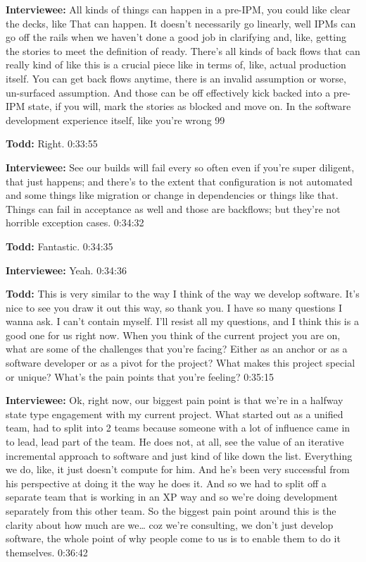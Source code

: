 \textbf{Interviewee:} 	All kinds of things can happen in a pre-IPM, you could like clear the decks, like   That can happen.  It doesn't necessarily go linearly, well IPMs can go off the rails when we haven't done a good job in clarifying and, like, getting the stories to meet the definition of ready.  There's all kinds of back flows that can really kind of like this is a crucial piece like in terms of, like, actual production itself.  You can get back flows anytime, there is an invalid assumption or worse, un-surfaced assumption. And those can be off effectively kick backed into a pre-IPM state, if you will, mark the stories as blocked and move on.  In the software development experience itself, like you're wrong 99%

\textbf{Todd:}  	Right.  0:33:55

\textbf{Interviewee:} 	See our builds will fail every so often even if you're super diligent, that just happens; and there's to the extent that configuration is not automated and some things like migration or change in dependencies or things like that.  Things can fail in acceptance as well and those are backflows; but they're not horrible exception cases.  0:34:32

\textbf{Todd:}	Fantastic.   0:34:35

\textbf{Interviewee:}	Yeah.  0:34:36

\textbf{Todd:}	This is very similar to the way I think of the way we develop software.  It's nice to see you draw it out this way, so thank you.  I have so many questions I wanna ask.  I can't contain myself.  I'll resist all my questions, and I think this is a good one for us right now.  When you think of the current project you are on, what are some of the challenges that you're facing?  Either as an anchor or as a software developer or as a pivot for the project?  What makes this project special or unique?  What's the pain points that you're feeling?  0:35:15

\textbf{Interviewee:}  	Ok, right now, our biggest pain point is that we're in a halfway state type engagement with my current project.  What started out as a unified team, had to split into 2 teams because someone with a lot of influence came in to lead, lead part of the team.  He does not, at all, see the value of an iterative incremental approach to software and just kind of like down the list.  Everything we do, like, it just doesn't compute for him.  And he's been very successful from his perspective at doing it the way he does it.  And so we had to split off a separate team that is working in an XP way and so we're doing development separately from this other team.  So the biggest pain point around this is the clarity about how much are we… coz we're consulting, we don't just develop software, the whole point of why people come to us is to enable them to do it themselves.  0:36:42


